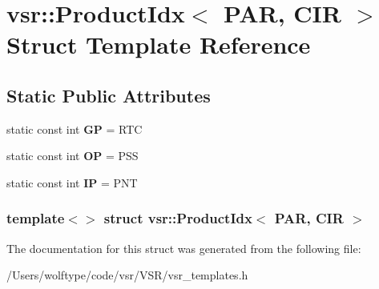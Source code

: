 \hypertarget{structvsr_1_1_product_idx_3_01_p_a_r_00_01_c_i_r_01_4}{\section{vsr\-:\-:Product\-Idx$<$ P\-A\-R, C\-I\-R $>$ Struct Template Reference}
\label{structvsr_1_1_product_idx_3_01_p_a_r_00_01_c_i_r_01_4}
}
\subsection*{Static Public Attributes}
\begin{DoxyCompactItemize}
\item 
\hypertarget{structvsr_1_1_product_idx_3_01_p_a_r_00_01_c_i_r_01_4_ace2ffe73e18543e369d9cbcbb711e5b6}{static const int {\bfseries G\-P} = R\-T\-C}\label{structvsr_1_1_product_idx_3_01_p_a_r_00_01_c_i_r_01_4_ace2ffe73e18543e369d9cbcbb711e5b6}

\item 
\hypertarget{structvsr_1_1_product_idx_3_01_p_a_r_00_01_c_i_r_01_4_a17df1938c2abe5002b808d1243cd39f7}{static const int {\bfseries O\-P} = P\-S\-S}\label{structvsr_1_1_product_idx_3_01_p_a_r_00_01_c_i_r_01_4_a17df1938c2abe5002b808d1243cd39f7}

\item 
\hypertarget{structvsr_1_1_product_idx_3_01_p_a_r_00_01_c_i_r_01_4_a912359ea0490498ca0a170c658e85878}{static const int {\bfseries I\-P} = P\-N\-T}\label{structvsr_1_1_product_idx_3_01_p_a_r_00_01_c_i_r_01_4_a912359ea0490498ca0a170c658e85878}

\end{DoxyCompactItemize}
\subsubsection*{template$<$$>$ struct vsr\-::\-Product\-Idx$<$ P\-A\-R, C\-I\-R $>$}



The documentation for this struct was generated from the following file\-:\begin{DoxyCompactItemize}
\item 
/\-Users/wolftype/code/vsr/\-V\-S\-R/vsr\-\_\-templates.\-h\end{DoxyCompactItemize}
